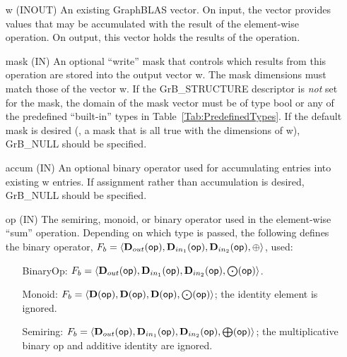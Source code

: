 \begin{itemize}[leftmargin=1.1in]
    \item[{\sf w}]    ({\sf INOUT}) An existing GraphBLAS vector.  On input,
    the vector provides values that may be accumulated with the result of the
    element-wise operation.  On output, this vector holds the results of the
    operation.

    \item[{\sf mask}] ({\sf IN}) An optional ``write'' mask that controls which
    results from this operation are stored into the output vector {\sf w}. The 
    mask dimensions must match those of the vector {\sf w}. If the 
    {\sf GrB\_STRUCTURE} descriptor is {\em not} set for the mask, the domain of the
    {\sf mask} vector must be of type {\sf bool} or any of the predefined 
    ``built-in'' types in Table~\ref{Tab:PredefinedTypes}.  If the default
    mask is desired (\ie, a mask that is all {\sf true} with the dimensions of {\sf w}), 
    {\sf GrB\_NULL} should be specified.

    \item[{\sf accum}] ({\sf IN}) An optional binary operator used for accumulating
    entries into existing {\sf w} entries.
    If assignment rather than accumulation is
    desired, {\sf GrB\_NULL} should be specified.

    \item[{\sf op}]    ({\sf IN}) The semiring, monoid, or binary operator 
    used in the element-wise ``sum'' operation.  Depending on which type is
    passed, the following defines the binary operator, 
    $F_b=\langle \mbox{$\mathbf{D}_{out}$}({\sf op}),\mbox{$\mathbf{D}_{in_{1}}$}({\sf op}),\mbox{$\mathbf{D}_{in_{2}}$}({\sf op}),\oplus\rangle$, used:
    \begin{itemize}[leftmargin=1.1in]
    \item[BinaryOp:] $F_b = \langle \mbox{$\mathbf{D}_{out}$}({\sf op}), \mbox{$\mathbf{D}_{in_{1}}$}({\sf op}),
    \mbox{$\mathbf{D}_{in_{2}}$}({\sf op}),\bold{\bigodot}({\sf op})\rangle$.  
    \item[Monoid:] $F_b = \langle \bold{D}({\sf op}), \bold{D}({\sf op}),
    \bold{D}({\sf op}),\bold{\bigodot}({\sf op})\rangle$;
    the identity element is ignored. 
    \item[Semiring:] $F_b = \langle \mbox{$\mathbf{D}_{out}$}({\sf op}), \mbox{$\mathbf{D}_{in_{1}}$}({\sf op}),
    \mbox{$\mathbf{D}_{in_{2}}$}({\sf op}),\bold{\bigoplus}({\sf op})\rangle$; the
    multiplicative binary op and additive identity are ignored.
    \end{itemize}
    

\end{itemize}
